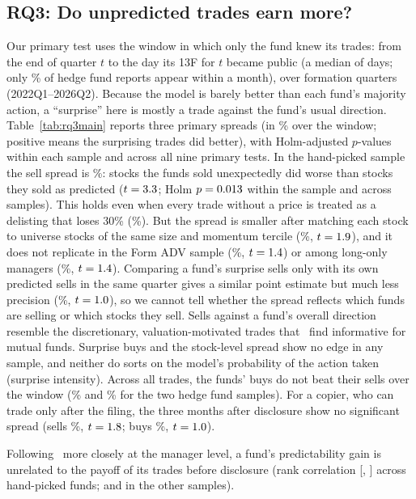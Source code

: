 \subsection{RQ3: Do unpredicted trades earn more?}



Our primary test uses the window in which only the fund knew its trades: from
the end of quarter $t$ to the day its 13F for $t$ became public (a median of
\filinglagmedian{} days; only \filedthirtyone\% of hedge fund reports appear
within a month), over \rqthreequartersM{} formation quarters
(2022Q1--2026Q2). Because the model is barely better than each fund's
majority action, a ``surprise'' here is mostly a trade against the fund's
usual direction. Table~\ref{tab:rq3main} reports three primary spreads (in \%
over the window; positive means the surprising trades did better), with
Holm-adjusted $p$-values within each sample and across all nine primary tests. In
the hand-picked sample the sell spread is \pdsellsM\%: stocks the funds sold
unexpectedly did worse than stocks they sold as predicted ($t =
3.3$; Holm $p = 0.013$ within the sample and
\pdsellsholmallM{} across samples). This holds even when every trade without
a price is treated as a delisting that loses 30\% (\pdsellsdlM\%). But the
spread is smaller after matching each stock to universe stocks of the same
size and momentum tercile (\pdsellschM\%, $t = 1.9$), and it does not
replicate in the Form ADV sample (\pdsellsA\%, $t = 1.4$) or among
long-only managers (\pdsellsL\%, $t = 1.4$). Comparing a fund's
surprise sells only with its own predicted sells in the same quarter gives a
similar point estimate but much less precision (\wfsellsM\%, $t =
1.0$), so we cannot tell whether the spread reflects which funds are
selling or which stocks they sell. Sells against a fund's overall direction
resemble the discretionary, valuation-motivated trades
that~\cite{alexander2007motivation} find informative for mutual funds.
Surprise buys and the stock-level spread show no edge in any sample, and
neither do sorts on the model's probability of the action taken (surprise
intensity). Across all trades, the funds' buys do not beat their sells over the window
(\pduncondM\% and \pduncondA\% for the two hedge fund samples). For a copier,
who can trade only after the filing, the three months after disclosure show
no significant spread (sells \cpsellsM\%, $t = 1.8$; buys
\cpbuysM\%, $t = 1.0$).

Following~\cite{cohen2026mimicking} more closely at the
manager level, a fund's predictability gain is unrelated to the payoff of its
trades before disclosure (rank correlation \mgrrhoM{} [\mgrloM, \mgrhiM]
across \mgrnM{} hand-picked funds; \mgrrhoA{} and \mgrrhoL{} in the other
samples).

